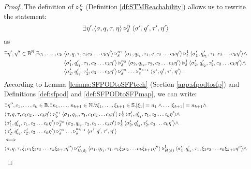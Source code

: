 \begin{proof}
  The definition of $\triangleright^{n}_{\delta}$ (Definition \ref{df:STMReachability}) allows us to rewrite the statement:
  $$
  \exists \eta'. \langle \sigma, q, \tau, \eta\rangle\triangleright^{n}_{\delta} \langle \sigma', q', \tau', \eta'\rangle
  $$
  as
  \begin{align*}
    \exists \eta', \eta''\in \mathbb{B}^{\mathbb{N}}.\exists c_1, \ldots, c_k. &\langle \sigma, q, \tau, c_1c_2\ldots c_k\eta'\rangle\triangleright^{n_1}_{\delta} \langle \sigma_1, q_{i_1}, \tau_1, c_1c_2\ldots c_k\eta'\rangle\triangleright^{1}_{\delta} \langle \sigma_1', q_{i_1}', \tau_1, c_2\ldots c_k\eta'\rangle \land \\
     &\langle \sigma_1', q_{i_1}', \tau_1, c_2\ldots c_k\eta'\rangle  \triangleright^{n_2}_{\delta} \langle \sigma_2, q_{i_2}, \tau_2, c_2\ldots c_k\eta'\rangle\triangleright^{1}_{\delta} \langle \sigma_2', q_{i_2}', \tau_2', c_3\ldots c_k\eta'\rangle \land \\
     &\langle \sigma_2', q_{i_2}', \tau_2', c_3\ldots c_k\eta'\rangle \triangleright^{n_3}_{\delta} \ldots \triangleright^{n_{k+1}}_{\delta}
    \langle \sigma', q', \tau', \eta'\rangle.
  \end{align*}
  According to Lemma \ref{lemma:SFPODtoSFPtech} (Section \ref{app:sfpodtosfp}) and Definitions \ref{def:sfpod} and \ref{def:SFPODtoSFPmap}, we can write:
  \small
  \begin{align*}
    &\exists \eta'', c_1, \ldots, c_k \in\Bool. \exists n_1, \ldots, n_{k+1}\in \Nat.  \forall \xi_1, \ldots, \xi_{k+1}\in \Ss. |\xi_1|=n_1\land \ldots |\xi_{k+1}|=n_{k+1}\land\\
    &\langle \sigma, q, \tau, c_1c_2\ldots c_k\eta'
    \rangle\reaches {n_1} \delta \langle \sigma_1, q_{i_1}, \tau_1, c_1c_2\ldots c_k\eta'\rangle\reaches 1 \delta \langle \sigma_1', q_{i_1}', \tau_1, c_2\ldots c_k\eta'\rangle \land \\
     &\langle \sigma_1', q_{i_1}', \tau_1, c_2\ldots c_k\eta'\rangle  \reaches {n_2} \delta \langle \sigma_2, q_{i_2}, \tau_2, c_2\ldots c_k\eta'\rangle\reaches 1 \delta \langle \sigma_2', q_{i_2}', \tau_2', c_3\ldots c_k\eta'\rangle \land \\
     &\langle \sigma_2', q_{i_2}', \tau_2', c_3\ldots c_k\eta'\rangle \reaches {n_3} \delta \ldots \reaches {n_{k+1}} \delta
    \langle \sigma', q', \tau', \eta'\rangle\\
    &\Longleftrightarrow\\
    &\langle \sigma, q, \tau, \xi_1c_1\xi_2c_2\ldots c_k\xi_{k+1}\eta''\rangle\reaches {n_1} {H(\delta)} \langle \sigma_1, q_{i_1}, \tau_1, c_1\xi_2c_2\ldots c_k\xi_{k+1}\eta''\rangle\reaches 1 {H(\delta)} \langle \sigma_1', q_{i_1}', \tau_1, \xi_2c_2\ldots c_k\xi_{k+1}\eta''\rangle \land \\

\end{align*}
\end{proof}
